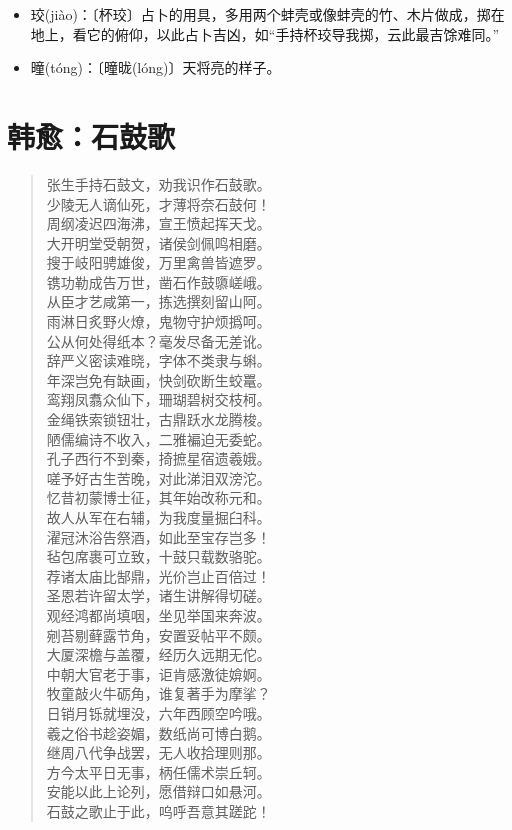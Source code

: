 \documentclass[12pt,oneside]{book}
\newenvironment{shici}{%
\begin{verse}\centering\yanti\large\hspace{12pt}}{\end{verse}}
\begin{document}
\begin{common-format}
\begin{itemize}
\item 珓(jiào)：〔杯珓〕占卜的用具，多用两个蚌壳或像蚌壳的竹、木片做成，掷在地上，看它的俯仰，以此占卜吉凶，如“手持杯珓导我掷，云此最吉馀难同。”
\item 曈(tóng)：〔曈昽(lóng)〕天将亮的样子。
\end{itemize}


\chapter{韩愈：石鼓歌}
\begin{shici}
张生手持石鼓文，劝我识作石鼓歌。\\
少陵无人谪仙死，才薄将奈石鼓何！\\
周纲凌迟四海沸，宣王愤起挥天戈。\\
大开明堂受朝贺，诸侯剑佩鸣相磨。\\
搜于岐阳骋雄俊，万里禽兽皆遮罗。\\
镌功勒成告万世，凿石作鼓隳嵯峨。\\
从臣才艺咸第一，拣选撰刻留山阿。\\
雨淋日炙野火燎，鬼物守护烦撝呵。\\
公从何处得纸本？毫发尽备无差讹。\\
辞严义密读难晓，字体不类隶与蝌。\\
年深岂免有缺画，快剑砍断生蛟鼍。\\
鸾翔凤翥众仙下，珊瑚碧树交枝柯。\\
金绳铁索锁钮壮，古鼎跃水龙腾梭。\\
陋儒编诗不收入，二雅褊迫无委蛇。\\
孔子西行不到秦，掎摭星宿遗羲娥。\\
嗟予好古生苦晚，对此涕泪双滂沱。\\
忆昔初蒙博士征，其年始改称元和。\\
故人从军在右辅，为我度量掘臼科。\\
濯冠沐浴告祭酒，如此至宝存岂多！\\
毡包席裹可立致，十鼓只载数骆驼。\\
荐诸太庙比郜鼎，光价岂止百倍过！\\
圣恩若许留太学，诸生讲解得切磋。\\
观经鸿都尚填咽，坐见举国来奔波。\\
剜苔剔藓露节角，安置妥帖平不颇。\\
大厦深檐与盖覆，经历久远期无佗。\\
中朝大官老于事，讵肯感激徒媕婀。\\
牧童敲火牛砺角，谁复著手为摩挲？\\
日销月铄就埋没，六年西顾空吟哦。\\
羲之俗书趁姿媚，数纸尚可博白鹅。\\
继周八代争战罢，无人收拾理则那。\\
方今太平日无事，柄任儒术崇丘轲。\\
安能以此上论列，愿借辩口如悬河。\\
石鼓之歌止于此，呜呼吾意其蹉跎！
\end{shici}


\end{common-format}
\end{document}
